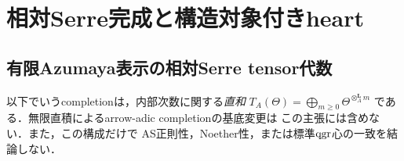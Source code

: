 \section{相対Serre完成と構造対象付きheart}
\label{sec:qa-relative-serre-completion}
\subsection{有限Azumaya表示の相対Serre tensor代数}
\label{subsec:qa-relative-morita-serre}

以下でいうcompletionは，内部次数に関する\emph{直和}
$T_A(\Theta)=\bigoplus_{m\ge0}\Theta^{\otimes_A^{\mathbf L}m}$
である．無限直積によるarrow-adic completionの基底変更は
この主張には含めない．また，この構成だけで
AS正則性，Noether性，または標準$\operatorname{qgr}$心の一致を結論しない．

